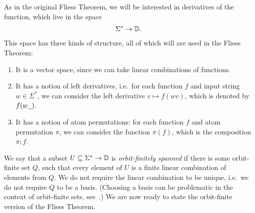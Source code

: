 As in the original Fliess Theorem, we will be interested in derivatives of the function, which live in the space  
\begin{align*}
\Sigma^* \to \mathbb D.
\end{align*}
This space has three kinds of structure, all of which will are used in the Fliess Theorem: 
\begin{enumerate}
    \item It is a vector space, since we can take linear combinations of functions.
    \item It has a notion of left derivatives, i.e.~for each function $f$ and input string $w \in \Sigma^*$, we can consider the left derivative $v \mapsto f(wv)$, which is denoted by $f(w\underline{\hspace{2mm}})$.
    \item It has a notion of atom permutations: for each function $f$ and atom permutation $\pi$, we can consider the function $\pi(f)$, which is the composition $\pi;f$.
\end{enumerate}

We say that a subset  $U \subseteq \Sigma^* \to \mathbb D$  is \emph{orbit-finitely spanned} if there is some orbit-finite set $Q$, such that  every element of $U$ is a finite linear combination of elements from $Q$. We do not require the linear combination to be unique, i.e.~we do not require $Q$ to be a basis. (Choosing a basis can be problematic in the context of orbit-finite sets, see~\cite[Example 77]{bojanczyk_slightly}.) We are now ready to state the orbit-finite version of the Fliess Theorem.

